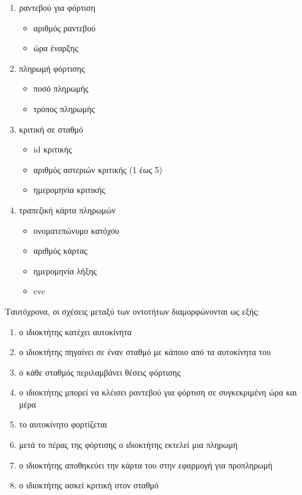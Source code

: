 \documentclass[manuscript,screen,review]{acmart}
\newcommand{\en}[1]{\foreignlanguage{english}{#1}}
\begin{document}
\begin{enumerate}
	\item ραντεβού για φόρτιση
	\begin{itemize}
		\item αριθμός ραντεβού
		\item ώρα έναρξης
	\end{itemize}
	\item πληρωμή φόρτισης
	\begin{itemize}
		\item ποσό πληρωμής
		\item τρόπος πληρωμής
	\end{itemize}
	\item κριτική σε σταθμό
	\begin{itemize}
		\item \en{id} κριτικής
		\item αριθμός αστεριών κριτικής (1 έως 5)
		\item ημερομηνία κριτικής
	\end{itemize}
	\item τραπεζική κάρτα πληρωμών
	\begin {itemize}
		\item ονοματεπώνυμο κατόχου 
		\item αριθμός κάρτας
		\item ημερομηνία λήξης
		\item \en{cvc}
	\end{itemize}
 \end{enumerate}
	
Ταυτόχρονα, οι σχέσεις μεταξύ των οντοτήτων διαμορφώνονται ως εξής:
		
\begin{enumerate}
	\item ο ιδιοκτήτης κατέχει αυτοκίνητα
	\item ο ιδιοκτήτης πηγαίνει σε έναν σταθμό με κάποιο από τα αυτοκίνητα του
	\item ο κάθε σταθμός περιλαμβάνει θέσεις φόρτισης
	\item ο ιδιοκτήτης μπορεί να κλέισει ραντεβού για φόρτιση σε συγκεκριμένη ώρα και μέρα
	\item το αυτοκίνητο φορτίζεται
	\item μετά το πέρας της φόρτισης ο ιδιοκτήτης εκτελεί μια πληρωμή
	\item ο ιδιοκτήτης αποθηκεύει την κάρτα του στην εφαρμογή για προπληρωμή
	\item ο ιδιοκτήτης ασκεί κριτική στον σταθμό
\end{enumerate}
\end{document}
